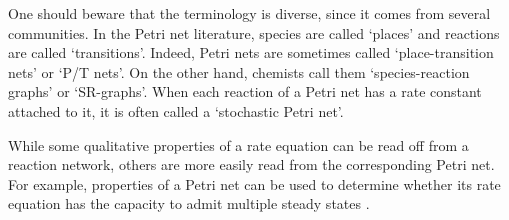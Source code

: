 \documentclass{compositionalityarticle}
\theoremstyle{plain}
\theoremstyle{remark}
\begin{document}
One should beware that the terminology is diverse, since it comes from several communities.  In the Petri net literature, species are called `places' and reactions are called `transitions'.  Indeed, Petri nets are sometimes called `place-transition nets' or `P/T nets'.  On the other hand, chemists call them `species-reaction graphs' or `SR-graphs'.   When each reaction of a Petri net has a rate constant attached to it, it is often called a `stochastic Petri net'.

While some qualitative properties of a rate equation can be read off from a reaction network, others are more easily read from the corresponding Petri net.  For example, properties of a Petri net can be used to determine whether its rate equation has the capacity to admit multiple steady states \cite{BanajiCraciun,CraciunFeinbergTang, FeinbergShinar}.  
\end{document}
